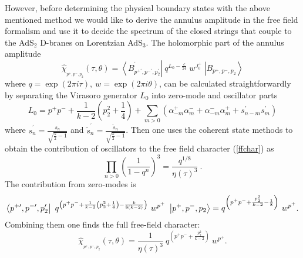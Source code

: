 \documentclass[a4paper,12pt]{article}
\begin{document}
However, before determining the physical boundary states with the above
mentioned method we would like to derive the annulus amplitude in the free
field formalism and use it to decide the spectrum of the closed strings that
couple to the AdS$_{2}$ D-branes on Lorentzian AdS$_{3}$. The holomorphic
part of the annulus amplitude
\begin{equation}
\hat{\chi}_{_{p^{+},p^{-},p_{2}}}\left( \tau ,\theta \right)
=\left\langle
B_{p^{+\prime },p^{-\prime },p_{2}^{\prime }}^{^{\prime }}\right| \ q^{L_{0}-%
\frac{c}{24}}\ w^{J_{0}^{+}}\ \left| B_{p^{+},p^{-},p_{2}}\right\rangle
\label{ffchar}
\end{equation}
where $q=\exp \left( 2\pi i\tau \right) ,\ w=\exp \left( 2\pi
i\theta \right) $,
can be calculated straightforwardly by separating the Virasoro generator $%
L_{0}$ into zero-mode and oscillator parts
\begin{equation}
L_{0}=p^{+}p^{-}+\frac{1}{k-2}\left( p_{2}^{2}+\frac{1}{4}\right)
+\sum_{m>0}\left( \alpha _{-m}^{+}\alpha _{m}^{-}+\alpha _{-m}^{-}\alpha
_{m}^{+}+s_{n-m}^{\prime }s_{m}^{\prime }\right)  \label{L0}
\end{equation}
where $s_{n}^{^{\prime }}=\frac{s_{n}}{\sqrt{\frac{k}{2}-1}}$ and $\tilde{s}%
_{n}^{^{\prime }}=\frac{\tilde{s}_{n}}{\sqrt{\frac{k}{2}-1}}$. Then one uses
the coherent state methods to obtain the contribution of oscillators to the
free field character (\ref{ffchar}) as
\begin{equation}
\prod_{n>0}\left( \frac{1}{1-q^{n}}\right) ^{3}=\frac{q^{1/8}}{\eta \left(
\tau \right) ^{3}}\ .
\end{equation}
The contribution from zero-modes is
\begin{equation}
\left\langle p^{+\prime },p^{-\prime },p_{2}^{\prime }\right| \ q^{\left(
p^{+}p^{-}+\frac{1}{k-2}\left( p_{2}^{2}+\frac{1}{4}\right) -\frac{k}{%
8\left( k-2\right) }\right) }\ w^{p^{+}}\ \left|
p^{+},p^{-},p_{2}\right\rangle =q^{\left( p^{+}p^{-}+\frac{p_{2}^{2}}{k-2}-%
\frac{1}{8}\right) }\ w^{p^{+}}.
\end{equation}
Combining them one finds the full free-field character:
\begin{equation}
\hat{\chi}_{_{p^{+},p^{-},p_{2}}}\left( \tau ,\theta \right)
=\frac{1}{\eta \left( \tau \right) ^{3}}\ q^{\left(
p^{+}p^{-}+\frac{p_{2}^{2}}{k-2}\right) }\ w^{p^{+}}.
\label{fullffchar}
\end{equation}
\end{document}
